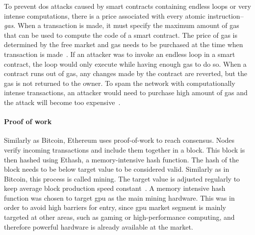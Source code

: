 To prevent \acrfull{dos} attacks caused by smart contracts containing endless loops or very intense computations, there is a price associated with every atomic instruction--\textit{gas}. When a transaction is made, it must specify the maximum amount of gas that can be used to compute the code of a smart contract. The price of gas is determined by the free market and gas needs to be purchased at the time when transaction is made~\cite{EthereumCommunityEthereumDocumentation}. If an attacker was to invoke an endless loop in a smart contract, the loop would only execute while having enough gas to do so. When a contract runs out of gas, any changes made by the contract are reverted, but the gas is not returned to the owner. To spam the network with computationally intense transactions, an attacker would need to purchase high amount of gas and the attack will become too expensive~\cite[p.5]{Atzei2017ASoK}.

\paragraph{Proof of work}
Similarly as Bitcoin, Ethereum uses proof-of-work to reach consensus. Nodes verify incoming transactions and include them together in a block. This block is then hashed using Ethash, a memory-intensive hash function. The hash of the block needs to be below target value to be considered valid. Similarly as in Bitcoin, this process is called mining. The target value is adjusted regularly to keep average block production speed constant~\cite{Tikhomirov2018Ethereum:Perspectives}. A memory intensive hash function was chosen to target \acrshort{gpu} as the main mining hardware. This was in order to avoid high barriers for entry, since \acrshort{gpu} market segment is mainly targeted at other areas, such as gaming or high-performance computing, and therefore powerful hardware is already available at the market\footnotemark.
% 

